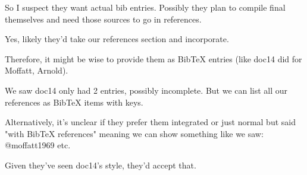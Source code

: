 \documentclass[12pt]{article}
\begin{document}
So I suspect they want actual bib entries. Possibly they plan to compile final themselves and need those sources to go in references.

Yes, likely they'd take our references section and incorporate.

Therefore, it might be wise to provide them as BibTeX entries (like doc14 did for Moffatt, Arnold).

We saw doc14 only had 2 entries, possibly incomplete. But we can list all our references as BibTeX items with keys.

Alternatively, it's unclear if they prefer them integrated or just normal but said "with BibTeX references" meaning we can show something like we saw:
@moffatt1969 etc.

Given they've seen doc14's style, they'd accept that.
\end{document}
